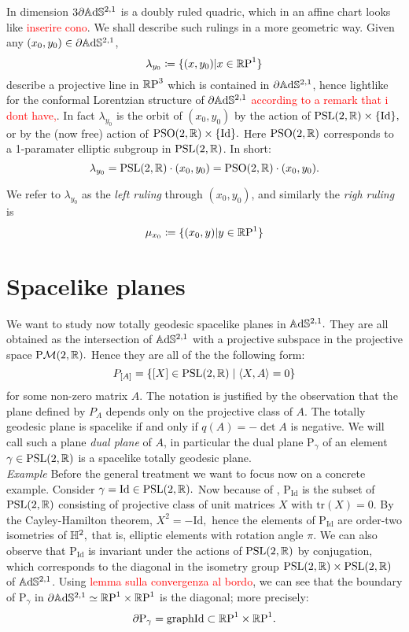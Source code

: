 In dimension $3 \partial\mathbb{A}\mathrm{d}\mathbb{S}^{2,1}$ is a doubly ruled quadric, which in an affine chart looks like \textcolor{red}{inserire cono}. We shall describe such rulings in a more geometric way. Given any $(x_0,y_0)\in\partial\mathbb{A}\mathrm{d}\mathbb{S}^{2,1}$, 
\[
    \lambda_{y_0}\coloneqq\{(x,y_0)|x\in\mathbb{R}\text{P}^1\}
\]  
describe a projective line in $\mathbb{R}\text{P}^3$ which is contained in $\partial\mathbb{A}\mathrm{d}\mathbb{S}^{2,1}$, hence lightlike for the conformal Lorentzian structure of $\partial\mathbb{A}\mathrm{d}\mathbb{S}^{2,1}$ \textcolor{red}{according to a remark that i dont have,}. In fact $\lambda_{y_0}$ is the orbit of $(x_0,y_0)$ by the action of $\text{PSL}(2,\mathbb{R})\times\{\text{Id}\},$ or by the (now free) action of $\text{PSO}(2,\mathbb{R})\times\{\text{Id}\}.$ Here $\text{PSO}(2,\mathbb{R})$ corresponds to a 1-paramater elliptic subgroup in $\text{PSL}(2,\mathbb{R})$. In short: 
\[
    \lambda_{y_0}=\text{PSL}(2,\mathbb{R})\cdot(x_0,y_0)=\text{PSO}(2,\mathbb{R})\cdot(x_0,y_0).
\]

We refer to $\lambda_{y_0}$ as the \textit{left ruling} through $(x_0,y_0)$, and similarly the \textit{righ ruling} is 
\[
    \mu_{x_0}\coloneqq\{(x_0,y)|y\in\mathbb{R}\text{P}^1\}
\]

\section{Spacelike planes}
We want to study now totally geodesic spacelike planes in $\mathbb{A}\mathrm{d}\mathbb{S}^{2,1}.$ They are all obtained as the intersection of $\mathbb{A}\mathrm{d}\mathbb{S}^{2,1}$ with a projective subspace in the projective space $\text{P}\mathcal{M}(2,\mathbb{R}).$ Hence they are all of the the following form: 
\begin{equation}\label{geoplanes}
    P_{[A]}=\{[X]\in\text{PSL}(2,\mathbb{R})\;|\;\langle X,A\rangle=0\}
\end{equation}
for some non-zero matrix $A$. The notation is justified by the observation that the plane defined by $P_A$ depends only on the projective class of $A$.  The totally geodesic plane is spacelike if and only if $q(A)=-\det A$ is negative. We will call such a plane \textit{dual plane} of $A$, in particular the dual plane $\text{P}_\gamma$  of an element $\gamma\in\text{PSL}(2,\mathbb{R})$ is a spacelike totally geodesic plane. \\
\textit{Example}
Before the general treatment we want to focus now on a concrete example. Consider $\gamma=\text{Id}\in\text{PSL}(2,\mathbb{R}).$ Now because of , $\text{P}_{\text{Id}}$ is the subset of $\text{PSL}(2,\mathbb{R})$ consisting of projective class of unit matrices $X$ with $\text{tr}(X)=0$. By the Cayley-Hamilton theorem, $X^2=-\text{Id},$ hence the elements of $\text{P}_{\text{Id}}$ are order-two isometries of $\mathbb{H}^2,$ that is, elliptic elements with rotation angle $\pi$.  We can also observe that $\text{P}_{\text{Id}}$ is invariant under the actions of $\text{PSL}(2,\mathbb{R})$ by conjugation, which corresponds to the diagonal in the isometry group $\text{PSL}(2,\mathbb{R})\times\text{PSL}(2,\mathbb{R})$ of $\mathbb{A}\mathrm{d}\mathbb{S}^{2,1}$. Using \textcolor{red}{lemma sulla convergenza al bordo}, we can see that the boundary of $\text{P}_\gamma$ in $\partial\mathbb{A}\mathrm{d}\mathbb{S}^{2,1}\simeq \mathbb{R}\text{P}^1\times\mathbb{R}\text{P}^1$ is the diagonal; more precisely: 
\begin{equation}\label{graphino}
    \partial\text{P}_\gamma=\text{graph{Id}}\subset \mathbb{R}\text{P}^1\times\mathbb{R}\text{P}^1.
\end{equation}

